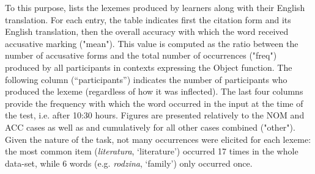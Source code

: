To this purpose,  lists the lexemes produced by learners along with their English translation. For each entry, the table indicates first the citation form and its English translation, then the overall accuracy with which the word received accusative marking ("mean"). This value is computed as the ratio between the number of accusative forms and the total number of occurrences ("freq") produced by all participants in contexts expressing the Object function. The following column (“participants”) indicates the number of participants who produced the lexeme (regardless of how it was inflected). The last four columns provide the frequency with which the word occurred in the input at the time of the test, i.e. after 10:30 hours. Figures are presented relatively to the NOM and ACC cases as well as and cumulatively for all other cases combined ("other"). Given the nature of the task, not many occurrences were elicited for each lexeme: the most common item (\textit{literatura}, ‘literature’) occurred 17 times in the whole data-set, while 6 words (e.g. \textit{rodzina}, ‘family’) only occurred once. 

